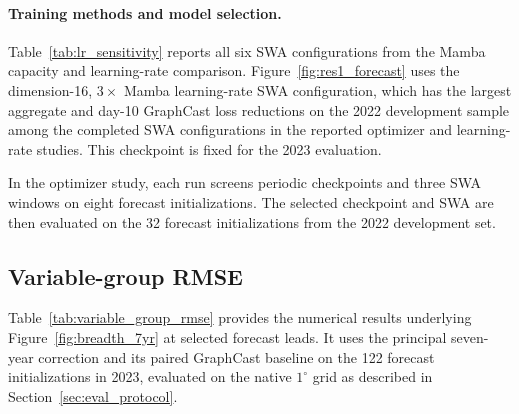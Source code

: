\documentclass[11pt]{article}
\begin{document}
\paragraph{Training methods and model selection.}
{{Table~\ref{tab:lr_sensitivity} reports all six SWA configurations from the Mamba capacity and learning-rate comparison.} Figure~\ref{fig:res1_forecast} uses the dimension-16, $3\times$ Mamba learning-rate SWA configuration, which has the largest aggregate and day-10 {GraphCast loss} reductions on the 2022 development sample among the completed SWA configurations in the reported optimizer and learning-rate studies.} {This checkpoint is fixed for the 2023 evaluation.}

{{In the optimizer study, each run screens periodic checkpoints and three SWA windows on eight forecast initializations.} The selected checkpoint and SWA are then evaluated on the 32 forecast initializations from the 2022 development set.}

\subsection{Variable-group RMSE}
\label{app:variable_group_rmse}

Table~\ref{tab:variable_group_rmse} provides the numerical results underlying Figure~\ref{fig:breadth_7yr} at selected forecast leads. {It uses the principal seven-year correction and its paired GraphCast baseline on the 122 forecast initializations in 2023, evaluated on the native $1^\circ$ grid as described in Section~\ref{sec:eval_protocol}.}
\end{document}
